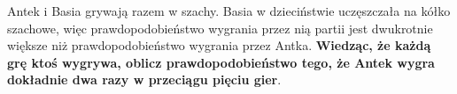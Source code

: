 Antek i Basia grywają razem w szachy. Basia w dzieciństwie uczęszczała na kółko szachowe, więc prawdopodobieństwo wygrania przez nią partii jest dwukrotnie większe niż prawdopodobieństwo wygrania przez Antka. \textbf{Wiedząc, że każdą grę ktoś wygrywa, oblicz prawdopodobieństwo tego, że Antek wygra dokładnie dwa razy w przeciągu pięciu gier}.